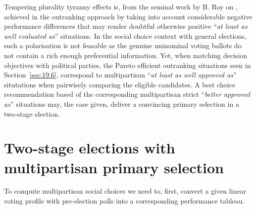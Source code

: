 Tempering plurality tyranny effects is, from the seminal work by B. Roy on \citep{ROY-1966}, achieved in the outranking approach by taking into account considerable negative performance differences that may render doubtful otherwise positive ``\emph{at least as well evaluated as}'' situations. In the social choice context with general elections, such a polarisation is not feasable as the genuine uninominal voting ballots do not contain a rich enough preferential information. Yet, when matching decision objectives with political parties, the Pareto efficient outranking situations seen in Section~\ref{sec:19.6}, correspond to multipartisan ``\emph{at least as well approved as}'' situtations when pairwisely comparing the eligible candidates. A best choice recommendation based of the corresponding multipartisan strict ``\emph{better approved as}'' situations may, the case given, deliver a convincing primary selection in a two-stage election. 

\section{Two-stage elections with multipartisan primary selection}
\label{sec:20.1}

To compute multipartisan social choices we need to, first, convert a given linear voting profile with pre-election polls into a corresponding performance tableau.


